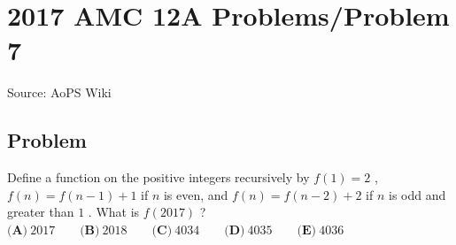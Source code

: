 \documentclass[12pt]{article}
\begin{document}
\section*{{2017 AMC 12A Problems/Problem 7}}
Source: AoPS Wiki

\subsection*{Problem}
Define a function on the positive integers recursively by $f(1) = 2$ , $f(n) = f(n-1) + 1$ if $n$ is even, and $f(n) = f(n-2) + 2$ if $n$ is odd and greater than $1$ . What is $f(2017)$ ? $\textbf{(A)}\ 2017 \qquad\textbf{(B)}\ 2018 \qquad\textbf{(C)}\ 4034 \qquad\textbf{(D)}\ 4035 \qquad\textbf{(E)}\ 4036$
\end{document}
